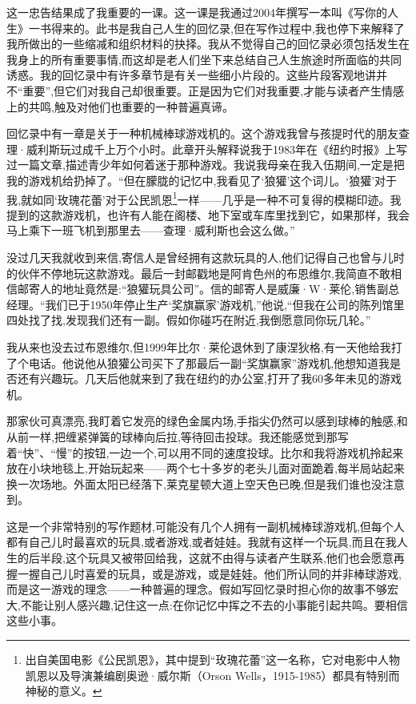 这一忠告结果成了我重要的一课。这一课是我通过2004年撰写一本叫《写你的人生》一书得来的。此书是我自己人生的回忆录,但在写作过程中,我也停下来解释了我所做出的一些缩减和组织材料的抉择。我从不觉得自己的回忆录必须包括发生在我身上的所有重要事情,而这却是老人们坐下来总结自己人生旅途时所面临的共同诱惑。我的回忆录中有许多章节是有关一些细小片段的。这些片段客观地讲并不“重要”,但它们对我自己却很重要。正是因为它们对我重要,才能与读者产生情感上的共鸣,触及对他们也重要的一种普遍真谛。

回忆录中有一章是关于一种机械棒球游戏机的。这个游戏我曾与孩提时代的朋友查理·威利斯玩过成千上万个小时。此章开头解释说我于1983年在《纽约时报》上写过一篇文章,描述青少年如何着迷于那种游戏。我说我母亲在我入伍期间,一定是把我的游戏机给扔掉了。“但在朦胧的记忆中,我看见了‘狼獾’这个词儿。‘狼獾’对于我,就如同‘玫瑰花蕾’对于公民凯恩\footnote{出自美国电影《公民凯恩》，其中提到“玫瑰花蕾”这一名称，它对电影中人物凯恩以及导演兼编剧奥逊·威尔斯（Orson Wells，1915-1985）都具有特别而神秘的意义。}一样——几乎是一种不可复得的模糊印迹。我提到的这款游戏机，也许有人能在阁楼、地下室或车库里找到它，如果那样，我会马上乘下一班飞机到那里去——查理·威利斯也会这么做。”


没过几天我就收到来信,寄信人是曾经拥有这款玩具的人,他们记得自己也曾与儿时的伙伴不停地玩这款游戏。最后一封邮戳地是阿肯色州的布恩维尔,我简直不敢相信邮寄人的地址竟然是:“狼獾玩具公司”。信的邮寄人是威廉·W·莱伦,销售副总经理。“我们已于1950年停止生产‘奖旗赢家’游戏机,”他说,“但我在公司的陈列馆里四处找了找,发现我们还有一副。假如你碰巧在附近,我倒愿意同你玩几轮。”

我从来也没去过布恩维尔,但1999年比尔·莱伦退休到了康涅狄格,有一天他给我打了个电话。他说他从狼獾公司买下了那最后一副“奖旗赢家”游戏机,他想知道我是否还有兴趣玩。几天后他就来到了我在纽约的办公室,打开了我60多年未见的游戏机。

那家伙可真漂亮,我盯着它发亮的绿色金属内场,手指尖仍然可以感到球棒的触感,和从前一样,把缠紧弹簧的球棒向后拉,等待回击投球。我还能感觉到那写着“快”、“慢”的按钮,一边一个,可以用不同的速度投球。比尔和我将游戏机拎起来放在小块地毯上,开始玩起来——两个七十多岁的老头儿面对面跪着,每半局站起来换一次场地。外面太阳已经落下,莱克星顿大道上空天色已晚,但是我们谁也没注意到。

这是一个非常特别的写作题材,可能没有几个人拥有一副机械棒球游戏机,但每个人都有自己儿时最喜欢的玩具,或者游戏,或者娃娃。我就有这样一个玩具,而且在我人生的后半段,这个玩具又被带回给我，这就不由得与读者产生联系,他们也会愿意再握一握自己儿时喜爱的玩具，或是游戏，或是娃娃。他们所认同的并非棒球游戏,而是这一游戏的理念——一种普遍的理念。假如写回忆录时担心你的故事不够宏大,不能让别人感兴趣,记住这一点:在你记忆中挥之不去的小事能引起共鸣。要相信这些小事。

